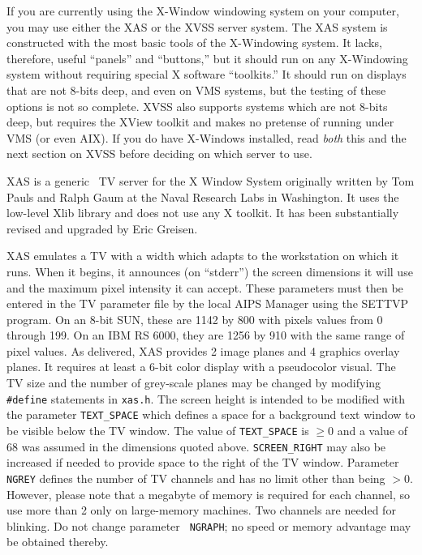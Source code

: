 
If you are currently using the X-Window windowing system on your
computer, you may use either the XAS or the XVSS server system.  The
XAS system is constructed with the most basic tools of the X-Windowing
system.  It lacks, therefore, useful ``panels'' and ``buttons,'' but
it should run on any X-Windowing system without requiring special X
software ``toolkits.''  It should run on displays that are not 8-bits
deep, and even on VMS systems, but the testing of these options is not
so complete.  XVSS also supports systems which are not 8-bits deep,
but requires the XView toolkit and makes no pretense of running under
VMS (or even \hbox{AIX}).  If you do have X-Windows installed, read
{\it both} this and the next section on XVSS before deciding on which
server to use.

XAS is a generic \AIPS\ TV server for the X Window System originally
written by Tom Pauls and Ralph Gaum at the Naval Research Labs in
Washington.  It uses the low-level Xlib library and does not use any
X toolkit.  It has been substantially revised and upgraded by Eric
Greisen.

XAS emulates a TV with a width which adapts to the workstation on
which it runs.  When it begins, it announces (on ``stderr'') the
screen dimensions it will use and the maximum pixel intensity it can
accept.  These parameters must then be entered in the TV parameter
file by the local AIPS Manager using the SETTVP program.  On an 8-bit
SUN, these are 1142 by 800 with pixels values from 0 through 199.  On
an IBM RS 6000, they are 1256 by 910 with the same range of pixel
values.  As delivered, XAS provides 2 image planes and 4 graphics
overlay planes.  It requires at least a 6-bit color display with a
pseudocolor visual.  The TV size and the number of grey-scale planes
may be changed by modifying {\tt \#define} statements in {\tt xas.h}.
The screen height is intended to be modified with the parameter
{\tt TEXT\_SPACE} which defines a space for a background text window
to be visible below the TV window.  The value of {\tt TEXT\_SPACE} is
$\ge 0$ and a value of 68 was assumed in the dimensions quoted above.
{\tt SCREEN\_RIGHT} may also be increased if needed to provide space
to the right of the TV window.  Parameter {\tt NGREY} defines the
number of TV channels and has no limit other than being $> 0$.
However, please note that a megabyte of memory is required for each
channel, so use more than 2 only on large-memory machines.  Two
channels are needed for blinking.  Do not change parameter {\tt
NGRAPH}; no speed or memory advantage may be obtained thereby.

